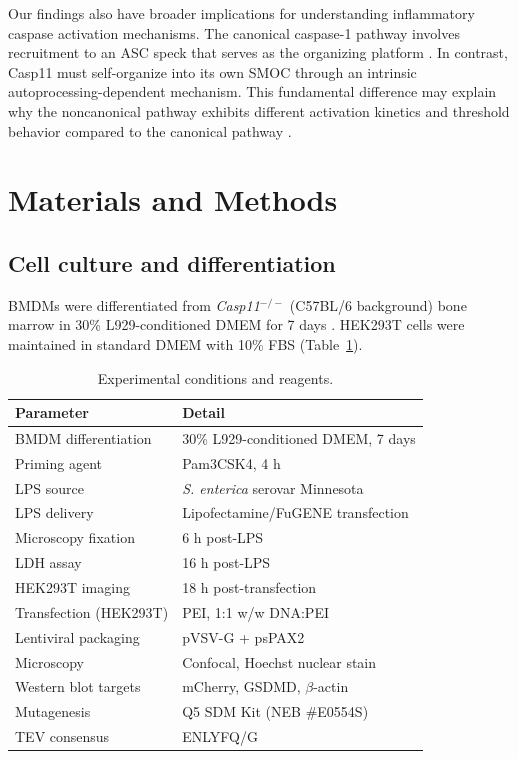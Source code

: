\documentclass[11pt,a4paper]{article}
\begin{document}
Our findings also have broader implications for understanding inflammatory caspase activation mechanisms. The canonical caspase-1 pathway involves recruitment to an ASC speck that serves as the organizing platform \citep{Lu2014, Dick2016}. In contrast, Casp11 must self-organize into its own SMOC through an intrinsic autoprocessing-dependent mechanism. This fundamental difference may explain why the noncanonical pathway exhibits different activation kinetics and threshold behavior compared to the canonical pathway \citep{Kayagaki2011, Hagar2013}.

\section{Materials and Methods}

\subsection{Cell culture and differentiation}
BMDMs were differentiated from \textit{Casp11$^{-/-}$} (C57BL/6 background) bone marrow in 30\% L929-conditioned DMEM for 7 days \citep{Kayagaki2011}. HEK293T cells were maintained in standard DMEM with 10\% FBS (Table~\ref{tab:conditions}).

\begin{table}[htbp]
\centering
\caption{Experimental conditions and reagents.}
\label{tab:conditions}
\begin{tabular}{ll}
\toprule
\textbf{Parameter} & \textbf{Detail} \\
\midrule
BMDM differentiation & 30\% L929-conditioned DMEM, 7 days \\
Priming agent & Pam3CSK4, 4 h \\
LPS source & \textit{S. enterica} serovar Minnesota \\
LPS delivery & Lipofectamine/FuGENE transfection \\
Microscopy fixation & 6 h post-LPS \\
LDH assay & 16 h post-LPS \\
HEK293T imaging & 18 h post-transfection \\
Transfection (HEK293T) & PEI, 1:1 w/w DNA:PEI \\
Lentiviral packaging & pVSV-G + psPAX2 \\
Microscopy & Confocal, Hoechst nuclear stain \\
Western blot targets & mCherry, GSDMD, $\beta$-actin \\
Mutagenesis & Q5 SDM Kit (NEB \#E0554S) \\
TEV consensus & ENLYFQ/G \\
\bottomrule
\end{tabular}
\end{table}
\end{document}
